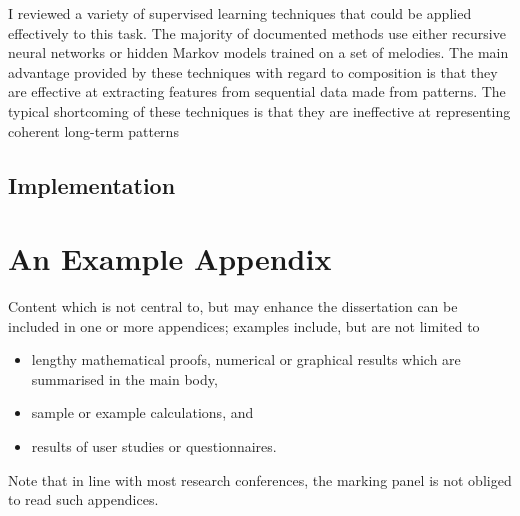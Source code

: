 \documentclass[ author={Stephen Livermore-Tozer},
				supervisor={Dr. Peter Flach},
				degree={MEng},
				title={Performing Algorithmic Co-composition Using Machine Learning},
				subtitle={},
				type={research},
				year={2016} ]{dissertation}
\begin{document}
	I reviewed a variety of supervised learning techniques that could be applied effectively to this task. The majority of documented methods use either recursive neural networks or hidden Markov models trained on a set of melodies. The main advantage provided by these techniques with regard to composition is that they are effective at extracting features from sequential data made from patterns.
	The typical shortcoming of these techniques is that they are ineffective at representing coherent long-term patterns
	
	\section{Implementation}
	
		
	\backmatter
	
	
	
	
	
	\appendix
	
	\chapter{An Example Appendix}
	\label{appx:example}
	
	Content which is not central to, but may enhance the dissertation can be 
	included in one or more appendices; examples include, but are not limited
	to
	
	\begin{itemize}
		\item lengthy mathematical proofs, numerical or graphical results which 
		are summarised in the main body,
		\item sample or example calculations, 
		and
		\item results of user studies or questionnaires.
	\end{itemize}
	
	\noindent
	Note that in line with most research conferences, the marking panel is not
	obliged to read such appendices.
	
	
\end{document}
